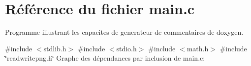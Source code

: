 \section{Référence du fichier main.\+c}
\label{main_8c}


Programme illustrant les capacites de generateur de commentaires de doxygen.  


{\ttfamily \#include $<$stdlib.\+h$>$}\newline
{\ttfamily \#include $<$stdio.\+h$>$}\newline
{\ttfamily \#include $<$math.\+h$>$}\newline
{\ttfamily \#include \char`\"{}readwritepng.\+h\char`\"{}}\newline
Graphe des dépendances par inclusion de main.\+c\+:
